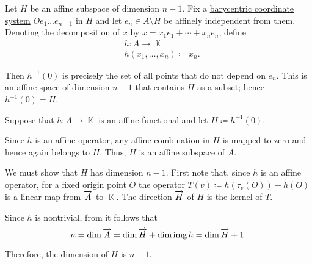 \begin{defproof}
   Let \( H \) be an affine subspace of dimension \( n - 1 \). Fix a \hyperref[def:barycentric_coordinate_system]{barycentric coordinate system} \( O e_1 \ldots e_{n-1} \) in \( H \) and let \( e_n \in A \setminus H \) be affinely independent from them. Denoting the decomposition of \( x \) by \( x = x_1 e_1 + \cdots + x_n e_n \), define
  \begin{equation*}
    \begin{aligned}
      &h: A \to \BbbK \\
      &h(x_1, \ldots, x_n) \coloneqq x_n.
    \end{aligned}
  \end{equation*}

  Then \( h^{-1}(0) \) is precisely the set of all points that do not depend on \( e_n \). This is an affine space of dimension \( n - 1 \) that contains \( H \) as a subset; hence \( h^{-1}(0) = H \).

   Suppose that \( h: A \to \BbbK \) is an affine functional and let \( H \coloneqq h^{-1}(0) \).

  Since \( h \) is an affine operator, any affine combination in \( H \) is mapped to zero and hence again belongs to \( H \). Thus, \( H \) is an affine subspace of \( A \).

  We must show that \( H \) has dimension \( n - 1 \). First note that, since \( h \) is an affine operator, for a fixed origin point \( O \) the operator \( T(v) \coloneqq h(\tau_v(O)) - h(O) \) is a linear map from \( \overrightarrow{A} \) to \( \BbbK \). The direction \( \overrightarrow{H} \) of \( H \) is the kernel of \( T \).

  Since \( h \) is nontrivial, from  it follows that
  \begin{equation*}
    n = \dim \overrightarrow{A} = \dim \overrightarrow{H} + \dim \operatorname{img} h = \dim \overrightarrow{H} + 1.
  \end{equation*}

  Therefore, the dimension of \( H \) is \( n - 1 \).
\end{defproof}
